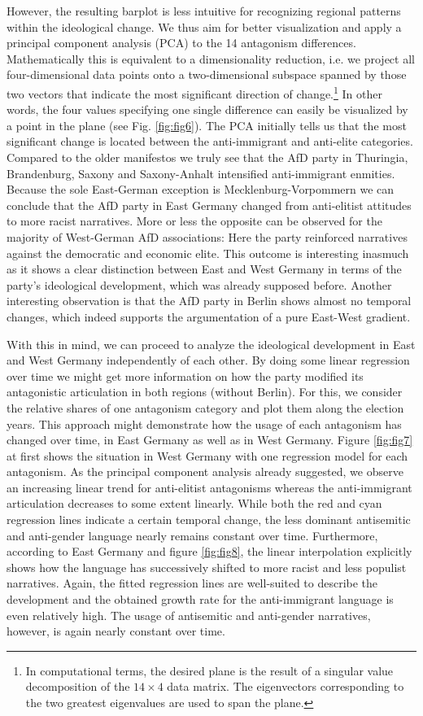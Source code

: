 \documentclass[a4paper]{scrreprt}
\begin{document}
However, the resulting barplot is less intuitive for recognizing regional patterns within the ideological change. We thus aim for better visualization and apply a principal component analysis (PCA) to the 14 antagonism differences. Mathematically this is equivalent to a dimensionality reduction, i.e. we project all four-dimensional data points onto a two-dimensional subspace spanned by those two vectors that indicate the most significant direction of change.\footnote{In computational terms, the desired plane is the result of a singular value decomposition of the $14\times 4$ data matrix. The eigenvectors corresponding to the two greatest eigenvalues are used to span the plane.} In other words, the four values specifying one single difference can easily be visualized by a point in the plane (see Fig. \ref{fig:fig6}). The PCA initially tells us that the most significant change is located between the anti-immigrant and anti-elite categories. Compared to the older manifestos we truly see that the AfD party in Thuringia, Brandenburg, Saxony and Saxony-Anhalt intensified anti-immigrant enmities. Because the sole East-German exception is Mecklenburg-Vorpommern we can conclude that the AfD party in East Germany changed from anti-elitist attitudes to more racist narratives. More or less the opposite can be observed for the majority of West-German AfD associations: Here the party reinforced narratives against the democratic and economic elite. This outcome is interesting inasmuch as it shows a clear distinction between East and West Germany in terms of the party's ideological development, which was already supposed before. Another interesting observation is that the AfD party in Berlin shows almost no temporal changes, which indeed supports the argumentation of a pure East-West gradient.\par
With this in mind, we can proceed to analyze the ideological development in East and West Germany independently of each other. By doing some linear regression over time we might get more information on how the party modified its antagonistic articulation in both regions (without Berlin). For this, we consider the relative shares of one antagonism category and plot them along the election years. This approach might demonstrate how the usage of each antagonism has changed over time, in East Germany as well as in West Germany. Figure \ref{fig:fig7} at first shows the situation in West Germany with one regression model for each antagonism. As the principal component analysis already suggested, we observe an increasing linear trend for anti-elitist antagonisms whereas the anti-immigrant articulation decreases to some extent linearly. While both the red and cyan regression lines indicate a certain temporal change, the less dominant antisemitic and anti-gender language nearly remains constant over time. Furthermore, according to East Germany and figure \ref{fig:fig8}, the linear interpolation explicitly shows how the language has successively shifted to more racist and less populist narratives. Again, the fitted regression lines are well-suited to describe the development and the obtained growth rate for the anti-immigrant language is even relatively high. The usage of antisemitic and anti-gender narratives, however, is again nearly constant over time.\par
\end{document}
